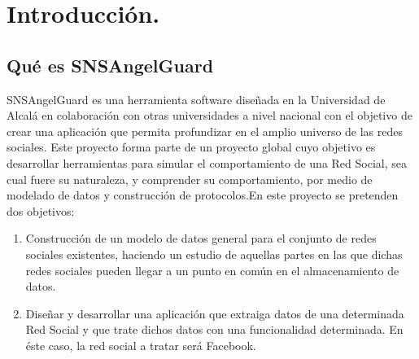 
\chapter{Introducción.} 

\section{Qué es SNSAngelGuard}
SNSAngelGuard es una herramienta software diseñada en la Universidad de Alcalá en colaboración con otras universidades a nivel nacional con el objetivo de crear una aplicación que permita profundizar en el amplio universo de las redes sociales. Este proyecto forma parte de un proyecto global cuyo objetivo es desarrollar herramientas para simular el comportamiento de una Red Social, sea cual fuere su naturaleza, y comprender su comportamiento, por medio de modelado de datos y construcción de protocolos.En este proyecto se pretenden dos objetivos:

\begin{enumerate}
\item Construcción de un modelo de datos general para el conjunto de redes sociales existentes, haciendo un estudio de aquellas partes en las que dichas redes sociales pueden llegar a un punto en común en el almacenamiento de datos.
\item Diseñar y desarrollar una aplicación que extraiga datos de una determinada Red Social y que trate dichos datos con una funcionalidad determinada. En éste caso, la red social a tratar será Facebook.
\end{enumerate}



